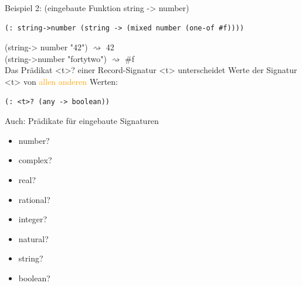 \documentclass[paper=a4, fontsize=11pt]{scrartcl}
\numberwithin{equation}{section}
\numberwithin{figure}{section}
\numberwithin{table}{section}
\begin{document}
Beispiel 2: (eingebaute Funktion string -> number) 
\begin{lstlisting}
(: string->number (string -> (mixed number (one-of #f))))
\end{lstlisting}
(string-> number "42") $\rightsquigarrow$ 42 \\
(string->number "fortytwo") $\rightsquigarrow$ \#f \\
Das Prädikat <t>? einer Record-Signatur <t> unterscheidet Werte der Signatur <t> von \textcolor{orange}{allen anderen } Werten:
\begin{lstlisting}
(: <t>? (any -> boolean))
\end{lstlisting}
Auch: Prädikate für eingebaute Signaturen \\
\begin{itemize}
\item number?
\item complex?
\item real?
\item rational?
\item integer?
\item natural?
\item string?
\item boolean?
\end{itemize}
\end{document}
